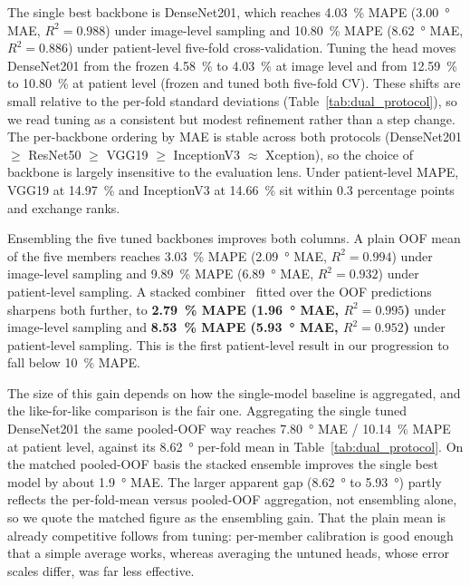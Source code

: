 The single best backbone is DenseNet201, which reaches \SI{4.03}{\percent} MAPE (\SI{3.00}{\degree} MAE, $R^2=0.988$) under image-level sampling and \SI{10.80}{\percent} MAPE (\SI{8.62}{\degree} MAE, $R^2=0.886$) under patient-level five-fold cross-validation. Tuning the head moves DenseNet201 from the frozen \SI{4.58}{\percent} to \SI{4.03}{\percent} at image level and from \SI{12.59}{\percent} to \SI{10.80}{\percent} at patient level (frozen and tuned both five-fold CV). These shifts are small relative to the per-fold standard deviations (Table~\ref{tab:dual_protocol}), so we read tuning as a consistent but modest refinement rather than a step change. The per-backbone ordering by MAE is stable across both protocols (DenseNet201 $\geq$ ResNet50 $\geq$ VGG19 $\geq$ InceptionV3 $\approx$ Xception), so the choice of backbone is largely insensitive to the evaluation lens. Under patient-level MAPE, VGG19 at \SI{14.97}{\percent} and InceptionV3 at \SI{14.66}{\percent} sit within \SI{0.3}{} percentage points and exchange ranks.

Ensembling the five tuned backbones improves both columns. A plain OOF mean of the five members reaches \SI{3.03}{\percent} MAPE (\SI{2.09}{\degree} MAE, $R^2=0.994$) under image-level sampling and \SI{9.89}{\percent} MAPE (\SI{6.89}{\degree} MAE, $R^2=0.932$) under patient-level sampling. A stacked combiner~\citep{Wolpert1992} fitted over the OOF predictions sharpens both further, to \textbf{\SI{2.79}{\percent} MAPE (\SI{1.96}{\degree} MAE, $R^2=0.995$)} under image-level sampling and \textbf{\SI{8.53}{\percent} MAPE (\SI{5.93}{\degree} MAE, $R^2=0.952$)} under patient-level sampling. This is the first patient-level result in our progression to fall below \SI{10}{\percent} MAPE.

The size of this gain depends on how the single-model baseline is aggregated, and the like-for-like comparison is the fair one. Aggregating the single tuned DenseNet201 the same pooled-OOF way reaches \SI{7.80}{\degree} MAE / \SI{10.14}{\percent} MAPE at patient level, against its \SI{8.62}{\degree} per-fold mean in Table~\ref{tab:dual_protocol}. On the matched pooled-OOF basis the stacked ensemble improves the single best model by about \SI{1.9}{\degree} MAE. The larger apparent gap (\SI{8.62}{\degree} to \SI{5.93}{\degree}) partly reflects the per-fold-mean versus pooled-OOF aggregation, not ensembling alone, so we quote the matched figure as the ensembling gain. That the plain mean is already competitive follows from tuning: per-member calibration is good enough that a simple average works, whereas averaging the untuned heads, whose error scales differ, was far less effective.

